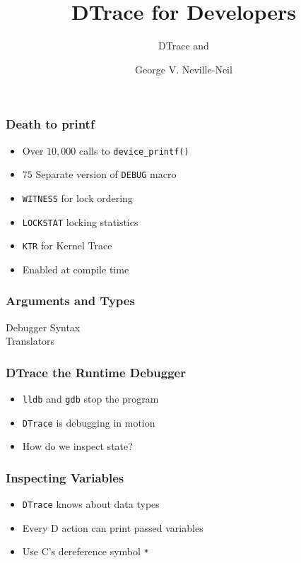 \documentclass[pdftex]{beamer}
\begin{document}

\title{DTrace for Developers}
\subtitle{DTrace and }
\author[shortname]{George V. Neville-Neil}

\begin{frame}
  \titlepage
\end{frame}

\begin{frame}[fragile]
  \frametitle{Death to printf}
  \begin{itemize}
  \item Over $10,000$ calls to \verb|device_printf()|
  \item $75$ Separate version of \verb|DEBUG| macro
  \item \verb|WITNESS| for lock ordering
  \item \verb|LOCKSTAT| locking statistics
  \item \verb|KTR| for Kernel Trace
  \item Enabled at compile time
  \end{itemize}
\end{frame}

\begin{frame}
  \frametitle{Arguments and Types}
  \begin{description}
  \item[Debugger Syntax] 
  \item[Translators] 
  \end{description}
\end{frame}

\begin{frame}[fragile]
  \frametitle{DTrace the Runtime Debugger}
  \begin{itemize}
  \item \verb+lldb+ and \verb+gdb+ stop the program
  \item \verb+DTrace+ is debugging in motion
  \item How do we inspect state?
  \end{itemize}
\end{frame}

\begin{frame}[fragile]
  \frametitle{Inspecting Variables}
  \begin{itemize}
  \item \verb+DTrace+ knows about data types
  \item Every D action can print passed variables
  \item Use C's dereference symbol \verb+*+
  \end{itemize}
\end{frame}
\end{document}
